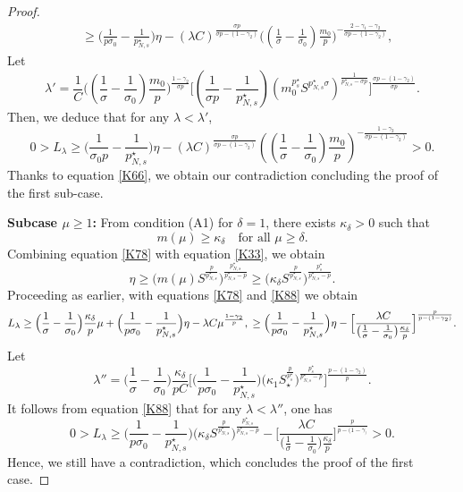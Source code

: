 \documentclass[10pt,a4paper]{amsart}
\numberwithin{equation}{section}
\begin{document}
\begin{proof}
\begin{align*}
&\geq\Big(\frac{1}{p\sigma_0}-\frac{1}{p^\star_{N,s}}\Big)\eta
 -( \lambda C)^\frac{\sigma p}{\sigma p-(1-\gamma_2)}
 \Big((\frac{1}{\sigma}-\frac{1}{\sigma_0})
 \frac{m_0}{p}\Big)^{-\frac{2-\gamma_1-\gamma_2}{\sigma p-(1-\gamma_2)}} ,
\end{align*}
Let
\begin{equation}\label{lambda1}
\lambda'=\frac{1}{C}\Big((\frac{1}{\sigma}
 -\frac{1}{\sigma_0})\frac{m_0}{p}\Big)^{\frac{1-\gamma_2}{\sigma p}}
 \Big[(\frac{1}{\sigma p}-\frac{1}{p^\star_{N,s}})(m_0^{p^\star_s}
 S^{p^\star_{N,s}\sigma})^\frac{1}{p^\star_{N,s}
 -\sigma p}\Big]^\frac{\sigma p-(1-\gamma_2)}{\sigma p}.
\end{equation}
Then, we deduce  that for any $\lambda<\lambda'$,
\begin{equation*}
0>L_\lambda\geq\Big(\frac{1}{\sigma_0p}
-\frac{1}{p^\star_{N,s}}\Big)\eta-(\lambda C)^\frac{\sigma p}{\sigma p-(1-\gamma_2)}
((\frac{1}{\sigma}-\frac{1}{\sigma_0})\frac{m_0}{p})^{-\frac{1-\gamma_2}
{\sigma p-(1-\gamma_2)}} >0.
\end{equation*}
Thanks to equation \eqref{K66}, we obtain our contradiction concluding the proof
of the first sub-case.
\smallskip

\noindent\textbf{Subcase $\mu\geq 1$:} 
From condition (A1) for $\delta=1$, there exists $\kappa_\delta>0$ such that
\begin{equation}\label{K78}
m(\mu)\geq \kappa_\delta \quad \text{for all } \mu\geq \delta.
\end{equation}
Combining equation \eqref{K78} with equation \eqref{K33}, we obtain
\begin{equation}\label{K88}
\eta\geq \Big(m(\mu)S^\frac{p}{p^\star_{N,s}}\Big)^\frac{p^\star_{N,s}}{p^\star_{N,s}-p}
 \geq \Big(\kappa_\delta S^\frac{p}{p^\star_{N,s}}\Big)^\frac{p^\star_s}
 {p^\star_{N,s}-p}.
\end{equation}
Proceeding as earlier, with equations \eqref{K78} and \eqref{K88} we obtain
\[
L_\lambda \geq \Big(\frac{1}{\sigma}-\frac{1}{\sigma_0}\Big)\frac{\kappa_\delta}{p}\mu
 +\Big(\frac{1}{p\sigma_0}-\frac{1}{p^\star_{N,s}}\Big)\eta
  -\lambda C \mu^\frac{1-\gamma_2}{p},\\
\geq \Big(\frac{1}{p\sigma_0}-\frac{1}{p^\star_{N,s}}\Big)\eta
 -\Big[\frac{\lambda C}{\big(\frac{1}{\sigma}-\frac{1}{\sigma_0}\big)
 \frac{\kappa_\delta}{p}}\Big]^\frac{p}{p-(1-\gamma_2)}.
\]
Let
\begin{equation}\label{lambda2}
\lambda''=\Big(\frac{1}{\sigma}-\frac{1}{\sigma_0}\Big)
\frac{\kappa_\delta}{pC }\Big[\Big(\frac{1}{p\sigma_0}
-\frac{1}{p^\star_{N,s}}\Big)\Big(\kappa_1S_\star^\frac{p}{p^\star_s}
 \Big)^\frac{p^\star_s}{p^\star_{N,s}-p}\Big]^\frac{p-(1-\gamma_2)}{p}.
\end{equation}
It follows from equation \eqref{K88} that for any $\lambda<\lambda''$, one has
\[
0>L_\lambda\geq\Big(\frac{1}{p\sigma_0}-\frac{1}{p^\star_{N,s}}\Big)
\Big(\kappa_\delta S^\frac{p}{p^\star_{N,s}}\Big)^\frac{p^\star_{N,s}}{p^\star_{N,s}-p}
-\Big[\frac{\lambda C}{\big(\frac{1}{\sigma}-\frac{1}{\sigma_0}\big)
\frac{\kappa_\delta}{p}}\Big]^\frac{p}{p-(1-\gamma_)}>0.
\]
Hence, we still have a contradiction, which concludes the proof of the first case.
\smallskip


\end{proof}
\end{document}
